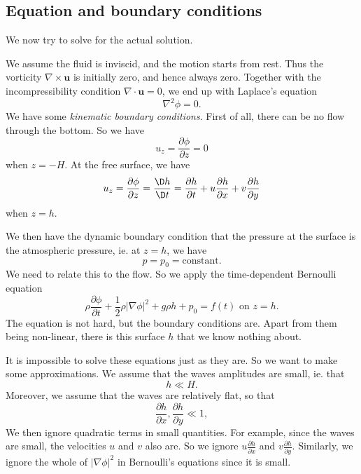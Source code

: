 \documentclass[a4paper]{article}
\begin{document}
\subsection{Equation and boundary conditions}
We now try to solve for the actual solution.
\begin{center}
\end{center}
We assume the fluid is inviscid, and the motion starts from rest. Thus the vorticity $\nabla \times \mathbf{u}$ is initially zero, and hence always zero. Together with the incompressibility condition $\nabla \cdot \mathbf{u} = 0$, we end up with Laplace's equation
\[
  \nabla^2 \phi = 0.
\]
We have some \emph{kinematic boundary conditions}. First of all, there can be no flow through the bottom. So we have
\[
  u_z = \frac{\partial \phi}{\partial z} = 0
\]
when $z = -H$. At the free surface, we have
\[
  u_z = \frac{\partial \phi}{\partial z} = \frac{\D h}{\D t} = \frac{\partial h}{\partial t} + u \frac{\partial h}{\partial x} + v \frac{\partial h}{\partial y}
\]
when $z = h$.

We then have the dynamic boundary condition that the pressure at the surface is the atmospheric pressure, ie. at $z = h$, we have
\[
  p = p_0 = \text{constant}.
\]
We need to relate this to the flow. So we apply the time-dependent Bernoulli equation
\[
  \rho \frac{\partial \phi}{\partial t} + \frac{1}{2} \rho|\nabla \phi|^2 + g\rho h + p_0 = f(t)\text{ on }z = h.
\]
The equation is not hard, but the boundary conditions are. Apart from them being non-linear, there is this surface $h$ that we know nothing about.

It is impossible to solve these equations just as they are. So we want to make some approximations. We assume that the waves amplitudes are small, ie. that
\[
  h \ll H.
\]
Moreover, we assume that the waves are relatively flat, so that
\[
  \frac{\partial h}{\partial x},\frac{\partial h}{\partial y} \ll 1,
\]
We then ignore quadratic terms in small quantities. For example, since the waves are small, the velocities $u$ and $v$ also are. So we ignore $u \frac{\partial h}{\partial x}$ and $v\frac{\partial h}{\partial y}$. Similarly, we ignore the whole of $|\nabla \phi|^2$ in Bernoulli's equations since it is small.
\end{document}

